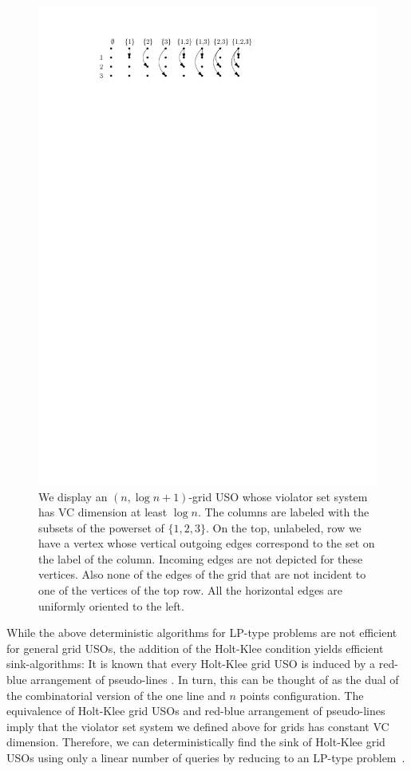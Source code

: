 \documentclass[runningheads,a4paper]{llncs}
\newcommand{\sinkalgs}{sink-algorithms\xspace}
\begin{document}
\begin{figure}[h!] 
  	\centering
  	\includegraphics{shatteredgrid.pdf}
  	\caption{\small We display an $(n,\log n + 1)$-grid USO whose violator set system has VC dimension at least $\log n$. 
	  The columns are labeled with the subsets of the powerset of $\{1,2,3\}$. On the top, unlabeled, row we have a vertex whose 
	  vertical outgoing edges correspond to the set on the label of the column. Incoming edges are not depicted for these vertices. Also none 
	  of the edges of the grid that are not incident to one of the vertices of the top row. All the horizontal edges are uniformly oriented to the left.} 
  	\label{fig:shatteredgrid}
  \end{figure}
  
While the above deterministic algorithms for LP-type problems are not efficient for general grid USOs, the addition of the Holt-Klee condition yields efficient \sinkalgs:
It is known that every Holt-Klee grid USO is induced by a red-blue arrangement of pseudo-lines \cite{grid05,falkthesis}. 
In turn, this can be thought of as the dual of the combinatorial version of the one line and $n$ points configuration.
The equivalence of Holt-Klee grid USOs and red-blue arrangement of pseudo-lines imply that the violator set system we defined above for grids has constant VC dimension. 
Therefore, we can deterministically find the sink of Holt-Klee grid USOs using only a linear number of queries by reducing to an LP-type problem~\cite{chan16,ChazelleM96}.
\end{document}
